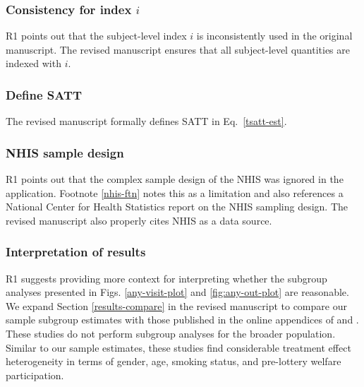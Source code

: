 \documentclass[hidelinks,12pt,letterpaper]{article}
\begin{document}
\subsubsection{Consistency for index $i$}

R1 points out that the subject-level index $i$ is inconsistently used in the original manuscript. The revised manuscript ensures that all subject-level quantities are indexed with $i$. 

\subsubsection{Define SATT}
The revised manuscript formally defines SATT in Eq.~\eqref{tsatt-est}.	
 
\subsubsection{NHIS sample design}

R1 points out that the complex sample design of the NHIS was ignored in the application. Footnote \ref{nhis-ftn} notes this as a limitation and also references a National Center for Health Statistics report on the NHIS sampling design. The revised manuscript also properly cites NHIS as a data source. 

\subsubsection{Interpretation of results}

R1 suggests providing more context for interpreting whether the subgroup analyses presented in Figs. \ref{any-visit-plot} and \ref{fig:any-out-plot} are reasonable. We expand Section \ref{results-compare} in the revised manuscript to compare our sample subgroup estimates with those published in the online appendices of \citep{Taubman} and \citet{NBERw22363}. These studies do not perform subgroup analyses for the broader population. Similar to our sample estimates, these studies find considerable treatment effect heterogeneity in terms of gender, age, smoking status, and pre-lottery welfare participation. 
\end{document}

